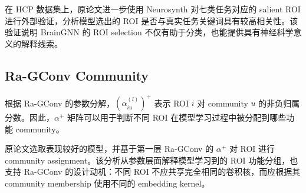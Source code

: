 在 HCP 数据集上，原论文进一步使用 Neurosynth 对七类任务对应的 salient ROI 进行外部验证，分析模型选出的 ROI 是否与真实任务关键词具有较高相关性。该验证说明 BrainGNN 的 ROI selection 不仅有助于分类，也能提供具有神经科学意义的解释线索。

\subsection{Ra-GConv Community}

根据 Ra-GConv 的参数分解，$(\alpha_{iu}^{(l)})^+$ 表示 ROI $i$ 对 community $u$ 的非负归属分数。因此，$\alpha^+$ 矩阵可以用于判断不同 ROI 在模型学习过程中被分配到哪些功能 community。

原论文选取表现较好的模型，并基于第一层 Ra-GConv 的 $\alpha^+$ 对 ROI 进行 community assignment。该分析从参数层面解释模型学习到的 ROI 功能分组，也支持 Ra-GConv 的设计动机：不同 ROI 不应共享完全相同的卷积核，而应根据其 community membership 使用不同的 embedding kernel。
